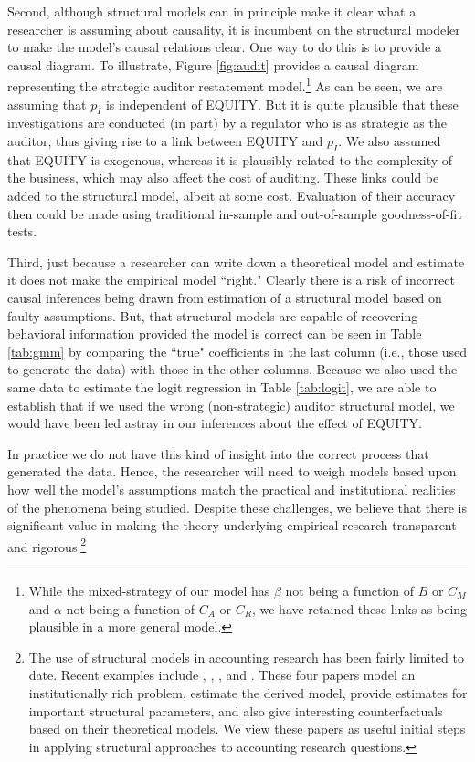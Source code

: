 \documentclass[12pt,reqno,titlepage]{amsart}
\theoremstyle{definition}
\begin{document}
\begin{doublespace}
Second, although structural models can in principle make it clear what a researcher is assuming about causality, it is incumbent on the structural modeler to make the model's causal relations clear.
One way to do this is to provide a causal diagram.
To illustrate, Figure \ref{fig:audit} provides a causal diagram representing the strategic auditor restatement model.\footnote{
While the mixed-strategy of our model has $\beta$ not being a function of $B$ or $C_M$ and $\alpha$ not being a function of $C_A$ or $C_R$, we have retained these links as being plausible in a more general model.}
As can be seen, we are assuming that $p_I$ is independent of EQUITY. 
But it is quite plausible that these investigations are conducted (in part) by a regulator who is as strategic as the auditor, thus giving rise to a link between EQUITY and $p_I$.
We also assumed that EQUITY is exogenous, whereas it is plausibly related to the complexity of the business, which may also affect the cost of auditing.
These links could be added to the structural model, albeit at some cost.
Evaluation of their accuracy then could be made using traditional in-sample and out-of-sample goodness-of-fit tests.

Third, just because a researcher can write down a theoretical model and estimate it does not make the empirical model ``right."
Clearly there is a risk of incorrect causal inferences being drawn from estimation of a structural model based on faulty assumptions.
But, that structural models are capable of recovering behavioral information provided the model is correct can be seen in Table \ref{tab:gmm} by comparing the ``true" coefficients in the last column (i.e., those used to generate the data) with those in the other columns.
Because we also used the same data to estimate the logit regression in Table \ref{tab:logit}, we are able to establish that if we used the wrong (non-strategic) auditor structural model, we would have been led astray in our inferences about the effect of EQUITY.

In practice we do not have this kind of insight into the correct process that generated the data.
Hence, the researcher will need to weigh models based upon how well the model's assumptions match the practical and institutional realities of the phenomena being studied.
Despite these challenges, we believe that there is significant value in making the theory underlying empirical research transparent and rigorous.\footnote{The use of structural models in accounting research has been fairly limited to date.  
Recent examples include \citet{Gerakos:2013cl}, \citet{Gerakos:2015aa}, \citet{Zakolyukina:2015aa}, and \citet{Bertomeu:2015aa}.  
These four papers model an institutionally rich problem, estimate the derived model, provide estimates for important structural parameters, and also give interesting counterfactuals based on their theoretical models. 
We view these papers as useful initial steps in applying structural approaches to accounting research questions.}


\end{doublespace}
\end{document}
